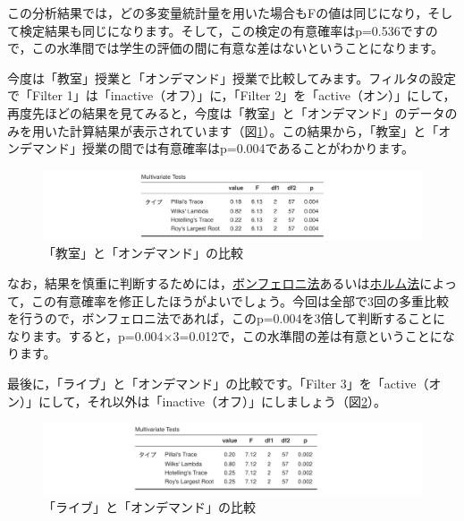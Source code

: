 \documentclass[
  12pt,
  a5jpaper,
  lualatex, ja=standard]{bxjsbook}
\begin{document}
この分析結果では，どの多変量統計量を用いた場合もFの値は同じになり，そして検定結果も同じになります。そして，この検定の有意確率はp=0.536ですので，この水準間では学生の評価の間に有意な差はないということになります。

今度は「教室」授業と「オンデマンド」授業で比較してみます。フィルタの設定で「Filter 1」は「inactive（オフ）」に，「Filter 2」を「active（オン）」にして，再度先ほどの結果を見てみると，今度は「教室」と「オンデマンド」のデータのみを用いた計算結果が表示されています（図\ref{fig:ANOVA-mancova-posthoc-results2}）。この結果から，「教室」と「オンデマンド」授業の間では有意確率はp=0.004であることがわかります。

\begin{figure}[!ht]

{\centering \includegraphics[width=1\linewidth]{images/ANOVA/mancova-posthoc-results2} 

}

\caption{「教室」と「オンデマンド」の比較}\label{fig:ANOVA-mancova-posthoc-results2}
\end{figure}

なお，結果を慎重に判断するためには，\protect\hyperlink{subsub:ANOVA-anova-posthoc-bonferroni}{ボンフェロニ法}あるいは\protect\hyperlink{subsub:ANOVA-anova-posthoc-holm}{ホルム法}によって，この有意確率を修正したほうがよいでしょう。今回は全部で3回の多重比較を行うので，ボンフェロニ法であれば，このp=0.004を3倍して判断することになります。すると，p=0.004×3=0.012で，この水準間の差は有意ということになります。

最後に，「ライブ」と「オンデマンド」の比較です。「Filter 3」を「active（オン）」にして，それ以外は「inactive（オフ）」にしましょう（図\ref{fig:ANOVA-mancova-posthoc-results3}）。

\begin{figure}[!ht]

{\centering \includegraphics[width=1\linewidth]{images/ANOVA/mancova-posthoc-results3} 

}

\caption{「ライブ」と「オンデマンド」の比較}\label{fig:ANOVA-mancova-posthoc-results3}
\end{figure}
\end{document}
